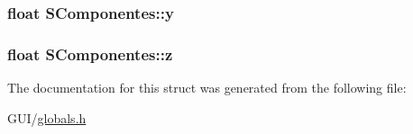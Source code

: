 \hypertarget{struct_s_componentes_a55baedc301b10640f4f52bbd2bb6a089}{
\subsubsection[{y}]{\setlength{\rightskip}{0pt plus 5cm}float S\-Componentes\-::y}}\label{struct_s_componentes_a55baedc301b10640f4f52bbd2bb6a089}
\hypertarget{struct_s_componentes_aafa661af95040f61d3137d608c4a5608}{
\subsubsection[{z}]{\setlength{\rightskip}{0pt plus 5cm}float S\-Componentes\-::z}}\label{struct_s_componentes_aafa661af95040f61d3137d608c4a5608}


The documentation for this struct was generated from the following file\-:\begin{DoxyCompactItemize}
\item 
G\-U\-I/\hyperlink{globals_8h}{globals.\-h}\end{DoxyCompactItemize}
